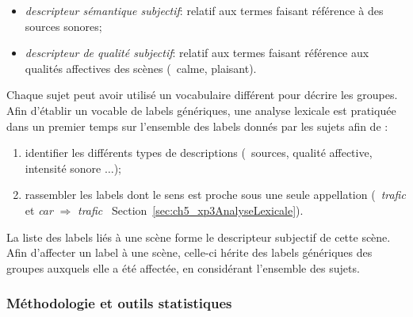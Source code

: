 \begin{itemize}
\item \emph{descripteur sémantique subjectif}: relatif aux termes faisant référence à des sources sonores;
\item \emph{descripteur de qualité subjectif}: relatif aux termes faisant référence aux qualités affectives des scènes (\eg~calme, plaisant).
\end{itemize}

Chaque sujet peut avoir utilisé un vocabulaire différent pour décrire les groupes. Afin d'établir un vocable de labels génériques, une analyse lexicale est pratiquée dans un premier temps sur l'ensemble des labels donnés par les sujets afin de :

\begin{enumerate}
\item identifier les différents types de descriptions (\eg~sources, qualité affective, intensité sonore $\ldots$);
\item rassembler les labels dont le sens est proche sous une seule appellation (\eg~\emph{trafic} et \emph{car} $\Longrightarrow$ \emph{trafic} \cf~Section~\ref{sec:ch5_xp3AnalyseLexicale}).
\end{enumerate}

La liste des labels liés à une scène forme le descripteur subjectif de cette scène. Afin d'affecter un label à une scène, celle-ci hérite des labels génériques des groupes auxquels elle a été affectée, en considérant l'ensemble des sujets. 

\subsubsection{Méthodologie et outils statistiques}

